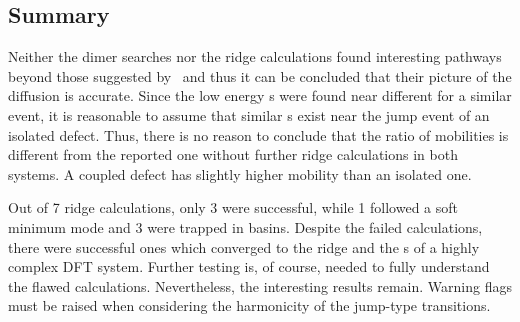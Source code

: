 \subsection{Summary}
Neither the dimer searches nor the ridge calculations found interesting pathways beyond those suggested by~\cite{double-defect-2011} and thus it can be concluded that their picture of the diffusion is accurate.
Since the low energy s were found near different  for a similar event, it is reasonable to assume that similar s exist near the jump event of an isolated defect.
Thus, there is no reason to conclude that the ratio of mobilities is different from the reported one without further ridge calculations in both systems.
A coupled defect has slightly higher mobility than an isolated one.

Out of 7 ridge calculations, only 3 were successful, while 1 followed a soft minimum mode and 3 were trapped in basins.
Despite the failed calculations, there were successful ones which converged to the ridge and the s of a highly complex DFT system.
Further testing is, of course, needed to fully understand the flawed calculations.
Nevertheless, the interesting results remain.
Warning flags must be raised when considering the harmonicity of the jump-type transitions.
